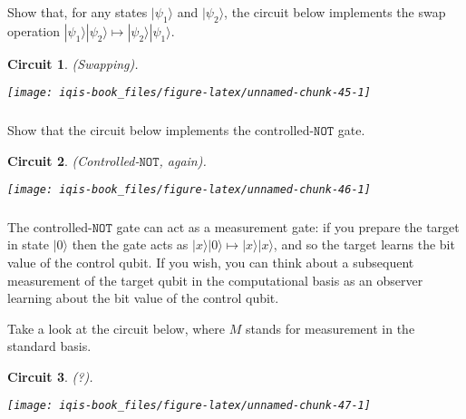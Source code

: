 \documentclass[fleqn]{article}
\newtheorem*{circuit}{Circuit}
\begin{document}
Show that, for any states \(|\psi_1\rangle\) and \(|\psi_2\rangle\), the circuit below implements the swap operation \(|\psi_1\rangle|\psi_2\rangle \mapsto |\psi_2\rangle|\psi_1\rangle\).

\begin{circuit}

(Swapping).

\begin{center}\texttt{[image: iqis-book\_files/figure-latex/unnamed-chunk-45-1]} \end{center}


\end{circuit}

\hypertarget{section-29}{%
\subsubsection{}\label{section-29}}

Show that the circuit below implements the controlled-\(\texttt{NOT}\) gate.

\begin{circuit}

(Controlled-\(\texttt{NOT}\), again).

\begin{center}\texttt{[image: iqis-book\_files/figure-latex/unnamed-chunk-46-1]} \end{center}


\end{circuit}

\hypertarget{section-30}{%
\subsubsection{}\label{section-30}}

The controlled-\(\texttt{NOT}\) gate can act as a measurement gate: if you prepare the target in state \(|0\rangle\) then the gate acts as \(|x\rangle|0\rangle\mapsto|x\rangle|x\rangle\), and so the target learns the bit value of the control qubit.
If you wish, you can think about a subsequent measurement of the target qubit in the computational basis as an observer learning about the bit value of the control qubit.

Take a look at the circuit below, where \(M\) stands for measurement in the standard basis.

\begin{circuit}

(?).

\begin{center}\texttt{[image: iqis-book\_files/figure-latex/unnamed-chunk-47-1]} \end{center}


\end{circuit}
\end{document}
